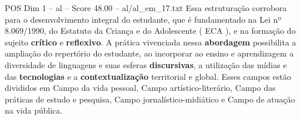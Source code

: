 \begin{textsample}{POS Dim 1 – al – Score 48.00 – al/al\_em\_17.txt}
Essa estruturação corrobora para o desenvolvimento integral do estudante, que é fundamentado na Lei nº 8.069/1990, do Estatuto da Criança e do Adolescente ( ECA ), e na formação do sujeito \textbf{crítico} e \textbf{reflexivo}.
A prática vivenciada nessa \textbf{abordagem} possibilita a ampliação do repertório do estudante, ao incorporar ao ensino e aprendizagem a diversidade de linguagens e suas esferas \textbf{discursivas}, a utilização das mídias e das \textbf{tecnologias} e a \textbf{contextualização} territorial e global.
Esses campos estão divididos em Campo da vida pessoal, Campo artístico-literário, Campo das práticas de estudo e pesquisa, Campo jornalístico-midiático e Campo de atuação na vida pública.

\end{textsample}
